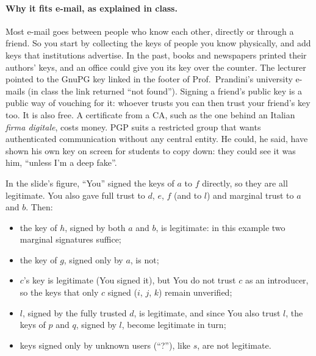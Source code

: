 \paragraph{Why it fits e-mail, as explained in class.} Most e-mail goes between people who know each other, directly or through a friend. So you start by collecting the keys of people you know physically, and add keys that institutions advertise. In the past, books and newspapers printed their authors' keys, and an office could give you its key over the counter. The lecturer pointed to the GnuPG key linked in the footer of Prof.\ Prandini's university e-mails (in class the link returned \enquote{not found}). Signing a friend's public key is a public way of vouching for it: whoever trusts you can then trust your friend's key too. It is also free. A certificate from a CA, such as the one behind an Italian \emph{firma digitale}, costs money. PGP suits a restricted group that wants authenticated communication without any central entity. He could, he said, have shown his own key on screen for students to copy down: they could see it was him, \enquote{unless I'm a deep fake}.

\begin{example}
In the slide's figure, \enquote{You} signed the keys of $a$ to $f$ directly, so they are all legitimate. You also gave full trust to $d$, $e$, $f$ (and to $l$) and marginal trust to $a$ and $b$. Then:
\begin{itemize}
    \item the key of $h$, signed by both $a$ and $b$, is legitimate: in this example two marginal signatures suffice;
    \item the key of $g$, signed only by $a$, is not;
    \item $c$'s key is legitimate (You signed it), but You do not trust $c$ as an introducer, so the keys that only $c$ signed ($i$, $j$, $k$) remain unverified;
    \item $l$, signed by the fully trusted $d$, is legitimate, and since You also trust $l$, the keys of $p$ and $q$, signed by $l$, become legitimate in turn;
    \item keys signed only by unknown users (\enquote{?}), like $s$, are not legitimate.
\end{itemize}
\end{example}

